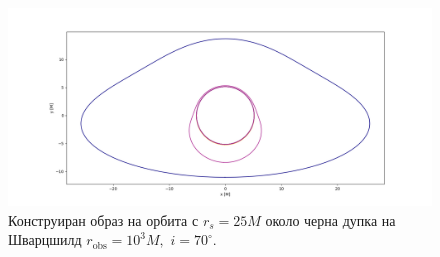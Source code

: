 \begin{figure}[h]
	\centering
	\includegraphics[scale = 0.3]{Schw_70_deg_r25.png}
	\caption[Конструиран образ на орбита с $r_s = 25M$ около черна дупка на Шварцшилд.]{\small Конструиран образ на орбита с $r_s = 25M$ около черна дупка на Шварцшилд $r_\text{obs} = 10^3M,\,\,i = 70^\circ$.} 
	\label{Scw_r25_orbit}
\end{figure}

\newpage

